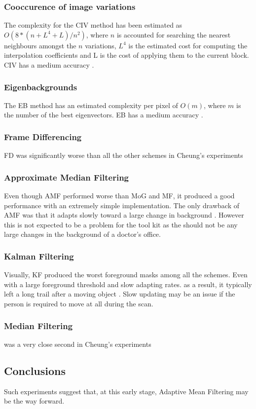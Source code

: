 \subsubsection{Cooccurence of image variations}
The complexity for the CIV \cite{Seki2003} method has been
estimated as $O(8*(n+L^4+L)/n^2)$, where $n$ is accounted for searching the nearest neighbours amongst the $n$ variations, $L^4$ is the estimated cost for computing the interpolation coefficients and L is the cost of applying them to the current block. CIV has a medium accuracy \cite{Piccardi2004}.\\

\subsubsection{Eigenbackgrounds}
The EB method \cite{Oliver2000} has an estimated complexity per pixel of $O(m)$, where $m$ is the number of the best eigenvectors. EB has a medium accuracy \cite{Piccardi2004}.\\

\subsubsection{Frame Differencing}
FD was significantly worse than all the other schemes in Cheung's experiments \cite{Cheung2007}

\subsubsection{Approximate Median Filtering} 
Even though AMF performed worse than MoG and MF, it produced a good performance with an extremely simple implementation. The only drawback of AMF was that it adapts slowly toward a large change in background \cite{Cheung2007}. However this is not expected to be a problem for the tool kit as the should not be any large changes in the background of a doctor's office.\\

\subsubsection{Kalman Filtering}
Visually, KF produced the worst foreground masks among all the schemes. Even with a large foreground threshold and slow adapting rates. as a result, it typically left a long trail after a moving object \cite{Cheung2007}. Slow updating may be an issue if the  person is required to move at all during the scan.\\

\subsubsection{Median Filtering}
was a very close second in Cheung's experiments \cite{Cheung2007}

\subsection{Conclusions}
Such experiments suggest that, at this early stage, Adaptive Mean Filtering may be the way forward.\\